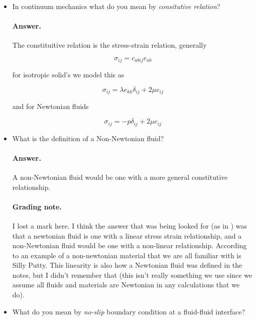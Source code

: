 \begin{itemize}
\item In continuum mechanics what do you mean by \textit{consitutive relation}?
\paragraph{Answer.}  The constituitive relation is the stress-strain relation, generally

\begin{equation}\label{eqn:continuumMidTermReflection:150}
\sigma_{ij} = c_{abij} e_{ab}
\end{equation}

for isotropic solid's we model this as 

\begin{equation}\label{eqn:continuumMidTermReflection:170}
\sigma_{ij} = \lambda e_{kk} \delta_{ij} + 2 \mu e_{ij}
\end{equation}

and for Newtonian fluids

\begin{equation}\label{eqn:continuumMidTermReflection:190}
\sigma_{ij} = -p \delta_{ij} + 2 \mu e_{ij}
\end{equation}

\item What is the definition of a Non-Newtonian fluid?
\paragraph{Answer.}

A non-Newtonian fluid would be one with a more general constitutive relationship.

\paragraph{Grading note.}  I lost a mark here.  I think the answer that was being looked for (as in \cite{wiki:newtonianFluids}) was that a newtonian fluid is one with a linear stress strain relationship, and a non-Newtonian fluid would be one with a non-linear relationship.  According to \cite{wiki:nonNewtonianFluid} an example of a non-newtonian material that we are all familiar with is Silly Putty.  This linearity is also how a Newtonian fluid was defined in the notes, but I didn't remember that (this isn't really something we use since we assume all fluids and materials are Newtonian in any calculations that we do).

\item What do you mean by \emph{no-slip} boundary condition at a fluid-fluid interface?


\end{itemize}

